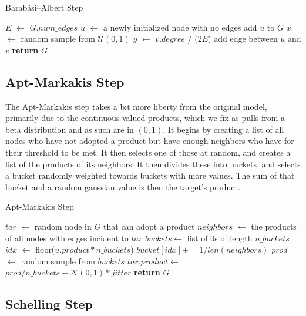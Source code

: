 \documentclass[12pt,twoside]{report}
\begin{document}
\begin{algorithm}
\caption{Barabási–Albert Step}
\begin{algorithmic}
\State $E$ $\gets$ $G.num\_edges$ 
\State $u$ $\gets$ a newly initialized node with no edges
\State add $u$ to $G$
\State $x$ $\gets$ random sample from $\mathcal{U}(0,1)$
\State $y$ $\gets$ $v.degree$ / ($2E$)
\State add edge between $u$ and $v$
\EndIf
\EndFor
\State \textbf{return} $G$
\EndFunction
\end{algorithmic}
\end{algorithm}


\subsection{Apt-Markakis Step}

The Apt-Markakis step takes a bit more liberty from the original model, primarily due to the continuous valued products, which we fix as pulls from a beta distribution and as such are in $(0,1)$. It begins by creating a list of all nodes who have not adopted a product but have enough neighbors who have for their threshold to be met. It then selects one of those at random, and creates a list of the products of its neighbors. It then divides these into buckets, and selects a bucket randomly weighted towards buckets with more values. The sum of that bucket and a random gaussian value is then the target's product. \\

\begin{algorithm}
\caption{Apt-Markakis Step}
\begin{algorithmic}
\State $tar$ $\gets$ random node in $G$ that can adopt a product
\State $neighbors$ $\gets$ the products of all nodes with edges incident to $tar$
\State $buckets \gets $ list of 0s of length $n\_buckets$
\State $idx$ $\gets$ floor($u.product * n\_buckets$)
\State $bucket[idx] += 1 / len(neighbors)$
\EndFor
\State $prod$ $\gets$ random sample from $buckets$
\State $tar.product \gets$ $prod / n\_buckets + \mathcal{N}(0,1) * jitter$
\State \textbf{return} $G$
\EndFunction
\end{algorithmic}
\end{algorithm}

\subsection{Schelling Step}
\end{document}
